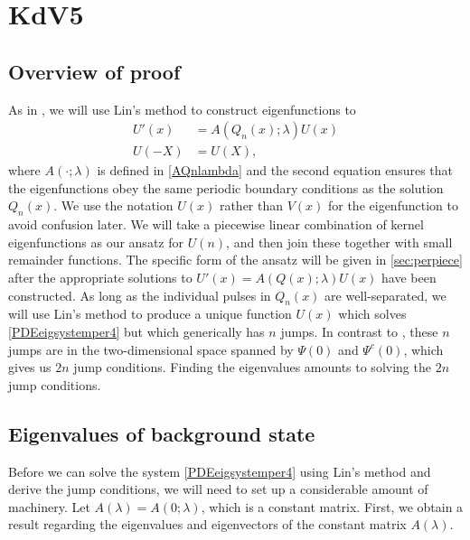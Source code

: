 \documentclass[thesis.tex]{subfiles}
\begin{document}
\iffulldocument\else
	\chapter{KdV5}
\fi

\section{Overview of proof}

As in \cite{Sandstede1998}, we will use Lin's method to construct eigenfunctions to
\begin{equation}\label{PDEeigsystemper4}
\begin{aligned}
U'(x) &= A(Q_n(x); \lambda)U(x) \\
U(-X) &= U(X),
\end{aligned}
\end{equation}
where $A(\cdot; \lambda)$ is defined in \cref{AQnlambda} and the second equation ensures that the eigenfunctions obey the same periodic boundary conditions as the solution $Q_n(x)$. We use the notation $U(x)$ rather than $V(x)$ for the eigenfunction to avoid confusion later. We will take a piecewise linear combination of kernel eigenfunctions as our ansatz for $U(n)$, and then join these together with small remainder functions. The specific form of the ansatz will be given in \cref{sec:perpiece} after the appropriate solutions to $U'(x) = A(Q(x); \lambda)U(x)$ have been constructed. As long as the individual pulses in $Q_n(x)$ are well-separated, we will use Lin's method to produce a unique function $U(x)$ which solves \cref{PDEeigsystemper4} but which generically has $n$ jumps. In contrast to \cite{Sandstede1998}, these $n$ jumps are in the two-dimensional space spanned by $\Psi(0)$ and $\Psi^c(0)$, which gives us $2n$ jump conditions. Finding the eigenvalues amounts to solving the $2n$ jump conditions. 

\section{Eigenvalues of background state}

Before we can solve the system \cref{PDEeigsystemper4} using Lin's method and derive the jump conditions, we will need to set up a considerable amount of machinery. Let $A(\lambda) = A(0; \lambda)$, which is a constant matrix. First, we obtain a result regarding the eigenvalues and eigenvectors of the constant matrix $A(\lambda)$.

\end{document}
